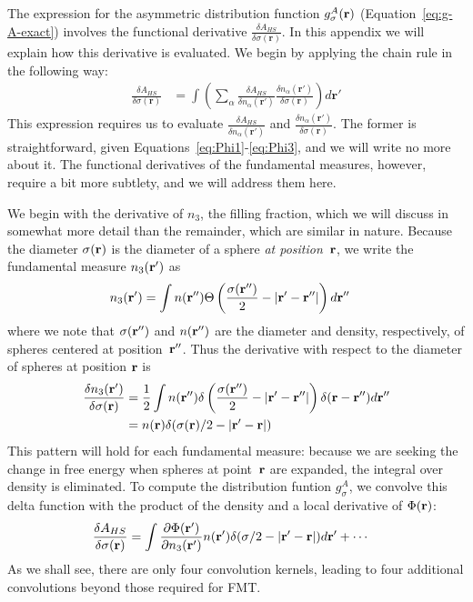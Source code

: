The expression for the asymmetric distribution function
$g_\sigma^A(\textbf{r})$ (Equation~\ref{eq:g-A-exact}) involves the
functional derivative $\frac{\delta A_{HS}}{\delta
  \sigma(\mathbf{r})}$.  In this appendix we will explain how this
derivative is evaluated.  We begin by applying the chain rule in the
following way:
  \begin{align}
    \frac{\delta A_{HS}}{\delta \sigma(\mathbf{r})} &=
    \int \left(
    \sum_\alpha
    \frac{\delta A_{HS}}{\delta n_\alpha(\mathbf{r}')}
    \frac{\delta n_\alpha(\mathbf{r}')}{\delta \sigma(\mathbf{r})}
    \right) d\mathbf{r}'
  \end{align}
This expression requires us to evaluate $\frac{\delta A_{HS}}{\delta
  n_\alpha(\mathbf{r}')}$ and $\frac{\delta
  n_\alpha(\mathbf{r}')}{\delta \sigma(\mathbf{r})}$.  The former is
straightforward, given Equations~\ref{eq:Phi1}-\ref{eq:Phi3}, and we
will write no more about it.  The functional derivatives of the
fundamental measures, however, require a bit more subtlety, and we
will address them here.

We begin with the derivative of $n_3$, the filling fraction, which we
will discuss in somewhat more detail than the remainder, which are
similar in nature.  Because the diameter $\sigma(\textbf{r})$ is the diameter
of a sphere \emph{at position~$\textbf{r}$}, we write the fundamental measure
$n_3(\textbf{r}')$ as
\begin{align}
  n_3(\textbf{r}') &= \int n(\textbf{r}'') \Theta\left(\frac{\sigma(\textbf{r}'')}{2}
  -\left|\textbf{r}' - \textbf{r}''\right|\right)
  d\textbf{r}''
\end{align}
where we note that $\sigma(\textbf{r}'')$ and $n(\textbf{r}'')$ are the diameter and
density, respectively, of spheres centered at position~$\textbf{r}''$.  Thus the
derivative with respect to the diameter of spheres at position
$\textbf{r}$ is
\begin{align}
  \frac{\delta n_3(\textbf{r}')}{\delta \sigma(\textbf{r})} &= \frac 12 \int n
  (\textbf{r}'') \delta\left(\frac{\sigma(\textbf{r}'')}{2} -\left|\textbf{r}' - \textbf{r}''\right|\right)
  \delta(\textbf{r}-\textbf{r}'') d\textbf{r}'' \\ &= n (\textbf{r}) \delta(\sigma(\textbf{r})/2
  -\left|\textbf{r}' - \textbf{r}\right|)
\end{align}
This pattern will hold for each fundamental measure: because we are
seeking the change in free energy when spheres at point~$\textbf{r}$ are
expanded, the integral over density is eliminated.  To compute the
distribution funtion $g_\sigma^A$, we convolve this delta function with
the product of the density and a local derivative of $\Phi(\textbf{r})$:
\begin{align}
  \frac{\delta A_{HS}}{\delta \sigma(\textbf{r})} &= \int \frac{\partial \Phi(\textbf{r}')}{\partial
    n_3(\textbf{r}')}n(\textbf{r}') \delta(\sigma/2-|\textbf{r}'-\textbf{r}|)d\textbf{r}'
  + \cdots
\end{align}
As we shall see, there are only four convolution kernels, leading to
four additional convolutions beyond those required for FMT.

